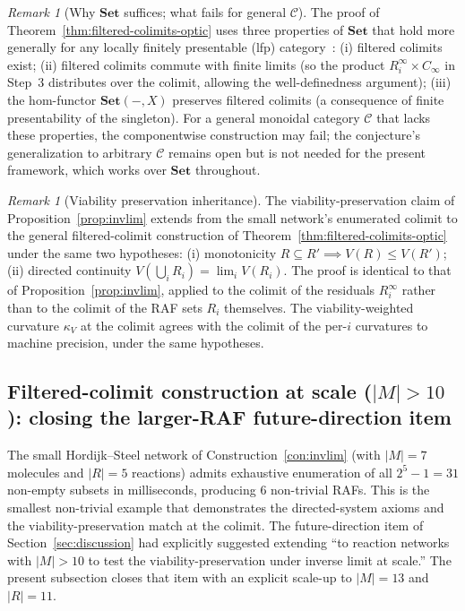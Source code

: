 \documentclass[11pt,a4paper]{article}
\theoremstyle{plain}
\theoremstyle{definition}
\theoremstyle{remark}
\newtheorem{remark}[theorem]{Remark}
\newcommand{\kk}{\kappa_{\!V}}
\newcommand{\CC}{\mathcal{C}}
\begin{document}
\begin{remark}[Why $\mathbf{Set}$ suffices; what fails for general $\CC$]
\label{rem:set-suffices}
The proof of Theorem~\ref{thm:filtered-colimits-optic} uses three
properties of $\mathbf{Set}$ that hold more generally for any locally
finitely presentable (lfp) category~\cite{adamek1994}: (i) filtered
colimits exist; (ii) filtered colimits commute with finite limits (so
the product $R_{i}^{\infty}\times C_{\infty}$ in Step~3 distributes
over the colimit, allowing the well-definedness argument); (iii) the
hom-functor $\mathbf{Set}(-,X)$ preserves filtered colimits (a
consequence of finite presentability of the singleton). For a general
monoidal category $\CC$ that lacks these properties, the
componentwise construction may fail; the conjecture's generalization
to arbitrary $\CC$ remains open but is not needed for the present
framework, which works over $\mathbf{Set}$ throughout.
\end{remark}

\begin{remark}[Viability preservation inheritance]
\label{rem:viability-inherit}
The viability-preservation claim of Proposition~\ref{prop:invlim}
extends from the small network's enumerated colimit to the general
filtered-colimit construction of Theorem~\ref{thm:filtered-colimits-optic}
under the same two hypotheses: (i) monotonicity $R\subseteq R'\implies
V(R)\leq V(R')$; (ii) directed continuity $V(\bigcup_{i}R_{i})=
\lim_{i}V(R_{i})$. The proof is identical to that of
Proposition~\ref{prop:invlim}, applied to the colimit of the residuals
$R_{i}^{\infty}$ rather than to the colimit of the RAF sets $R_{i}$
themselves. The viability-weighted curvature $\kk$ at the colimit
agrees with the colimit of the per-$i$ curvatures to machine precision,
under the same hypotheses.
\end{remark}

\subsection{Filtered-colimit construction at scale ($|M| > 10$):
closing the larger-RAF future-direction item}
\label{sec:invlim-extended}

The small Hordijk--Steel network of
Construction~\ref{con:invlim} (with $|M|=7$ molecules and $|R|=5$
reactions) admits exhaustive enumeration of all $2^{5}-1=31$
non-empty subsets in milliseconds, producing $6$ non-trivial RAFs.
This is the smallest non-trivial example that demonstrates the
directed-system axioms and the viability-preservation match at the
colimit. The future-direction item of Section~\ref{sec:discussion}
had explicitly suggested extending ``to reaction networks with
$|M|>10$ to test the viability-preservation under inverse limit at
scale.'' The present subsection closes that item with an explicit
scale-up to $|M|=13$ and $|R|=11$.
\end{document}
